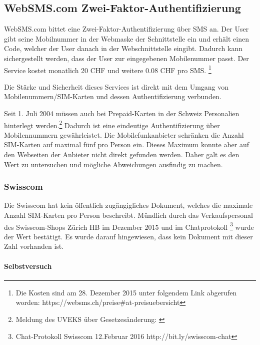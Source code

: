 \newpage

\subsection{WebSMS.com
Zwei-Faktor-Authentifizierung}\label{websms.com-zwei-faktor-authentifizierung}

WebSMS.com bittet eine Zwei-Faktor-Authentifizierung über SMS an. Der
User gibt seine Mobilnummer in der Webmaske der Schnittstelle ein und
erhält einen Code, welcher der User danach in der Webschnittstelle
eingibt. Dadurch kann sichergestellt werden, dass der User zur
eingegebenen Mobilenummer passt. Der Service kostet monatlich 20 CHF und
weitere 0.08 CHF pro SMS. \footnote{Die Kosten sind am 28. Dezember 2015
  unter folgendem Link abgerufen worden:
  https://websms.ch/preise\#at-preisuebersicht}

Die Stärke und Sicherheit dieses Services ist direkt mit dem Umgang von
Mobilenummern/SIM-Karten und dessen Authentifizierung verbunden.

Seit 1. Juli 2004 müssen auch bei Prepaid-Karten in der Schweiz
Personalien hinterlegt werden.\footnote{Meldung des UVEKS über
  Gesetzesänderung: \autocite{uvek}} Dadurch ist eine eindeutige
Authentifizierung über Mobilennummern gewährleistet. Die
Mobilefunkanbieter schränken die Anzahl SIM-Karten auf maximal fünf pro
Person ein. Dieses Maximum konnte aber auf den Webseiten der Anbieter
nicht direkt gefunden werden. Daher galt es den Wert zu untersuchen und
mögliche Abweichungen ausfindig zu machen.

\subsubsection{Swisscom}\label{swisscom}

Die Swisscom hat kein öffentlich zugängigliches Dokument, welches die
maximale Anzahl SIM-Karten pro Person beschreibt. Mündlich durch das
Verkaufspersonal des Swisscom-Shops Zürich HB im Dezember 2015 und im
Chatprotokoll \footnote{Chat-Protokoll Swisscom 12.Februar 2016
  http://bit.ly/swisscom-chat} wurde der Wert bestätigt. Es wurde darauf
hingewiesen, dass kein Dokument mit dieser Zahl vorhanden ist.

\paragraph{Selbstversuch}\label{selbstversuch}

